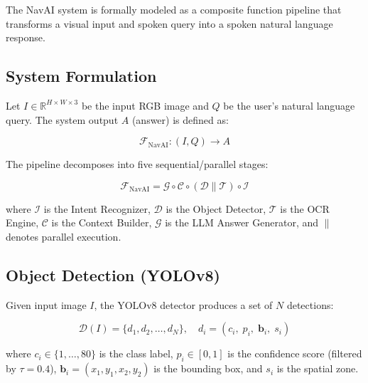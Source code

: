 

The NavAI system is formally modeled as a composite function pipeline that transforms a visual input and spoken query into a spoken natural language response.

\subsection{System Formulation}

Let $I \in \mathbb{R}^{H \times W \times 3}$ be the input RGB image and $Q$ be the user's natural language query. The system output $A$ (answer) is defined as:

\begin{equation}
\mathcal{F}_{\text{NavAI}}: (I, Q) \longrightarrow A
\end{equation}

The pipeline decomposes into five sequential/parallel stages:

\begin{equation}
\mathcal{F}_{\text{NavAI}} = \mathcal{G} \circ \mathcal{C} \circ (\mathcal{D} \parallel \mathcal{T}) \circ \mathcal{I}
\end{equation}

where $\mathcal{I}$ is the Intent Recognizer, $\mathcal{D}$ is the Object Detector, $\mathcal{T}$ is the OCR Engine, $\mathcal{C}$ is the Context Builder, $\mathcal{G}$ is the LLM Answer Generator, and $\parallel$ denotes parallel execution.

\subsection{Object Detection (YOLOv8)}

Given input image $I$, the YOLOv8 detector produces a set of $N$ detections:

\begin{equation}
\mathcal{D}(I) = \{d_1, d_2, \ldots, d_N\}, \quad d_i = (c_i,\; p_i,\; \mathbf{b}_i,\; s_i)
\end{equation}

where $c_i \in \{1, \ldots, 80\}$ is the class label, $p_i \in [0,1]$ is the confidence score (filtered by $\tau = 0.4$), $\mathbf{b}_i = (x_1, y_1, x_2, y_2)$ is the bounding box, and $s_i$ is the spatial zone.

